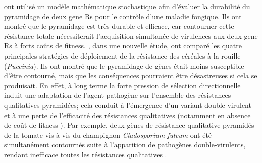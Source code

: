 	
	\citet{Rimbaud2018} ont utilisé un modèle mathématique stochastique afin d'évaluer la durabilité du pyramidage de deux \glspl{gene R} pour le contrôle d'une maladie fongique.
Ils ont montré que le pyramidage  est très durable et efficace, car contourner cette résistance totale nécessiterait l'acquisition simultanée de virulences aux deux \glspl{gene R} à forts coûts de fitness.
\citet{Rimbaud2018a}, dans une nouvelle étude, ont comparé les quatre  principales stratégies de déploiement de la résistance des céréales à la rouille (\textit{Puccinia}). Ils ont montré que le pyramidage de gènes était moins  susceptible d'être contourné, mais que les conséquences pourraient être  désastreuses si cela se produisait. En effet, à long terme la forte pression de sélection directionnelle induit une adaptation de l'agent pathogène sur l’ensemble des résistances qualitatives pyramidées; cela conduit à l'émergence d'un variant double-virulent  et  à une perte de l'efficacité des résistances qualitatives (notamment en absence de coût de fitness \citep{Lof2017}). Par exemple, deux gènes de résistance qualitative  pyramidés de  la tomate vis-à-vis du champignon \textit{Cladosporium fulvum} ont été  simultanément contournés suite à l’apparition de pathogènes double-virulents, rendant inefficace toutes les résistances qualitatives \citep{Lindhout2002}.
	
